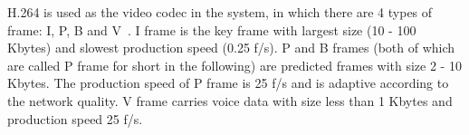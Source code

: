 

H.264 is used as the video codec in the system, in which there are 4 types of frame: I, P, B and V~\cite{schwarz2007overview}. I frame is the key frame with largest size (10 - 100 Kbytes) and slowest production speed (0.25 f/s). P and B frames (both of which are called P frame for short in the following) are predicted frames with size 2 - 10 Kbytes. The production speed of P frame is 25 f/s and is adaptive according to the network quality. V frame carries voice data with size less than 1 Kbytes and production speed 25 f/s. 




